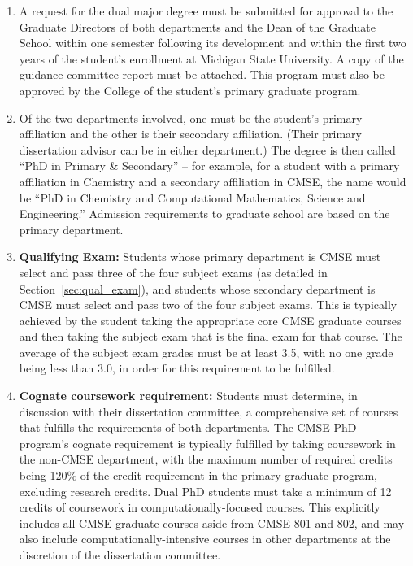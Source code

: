 \begin{enumerate}

\item  A request for the dual major degree must be submitted for
  approval to the Graduate Directors of both departments and the Dean
  of the Graduate School within one semester following its development
  and within the first two years of the student’s enrollment at
  Michigan State University.  A copy of the guidance committee report
  must be attached.  This program must also be approved by the College
  of the student's primary graduate program.

\item Of the two departments involved, one must be the student's
  primary affiliation and the other is their secondary affiliation.
  (Their primary dissertation advisor can be in either department.)  The
  degree is then called ``PhD in Primary \& Secondary'' -- for
  example, for a student with a primary affiliation in Chemistry and a
  secondary affiliation in CMSE, the name would be ``PhD in Chemistry
  and Computational Mathematics, Science and Engineering.'' Admission
  requirements to graduate school are based on the primary department.

\item \textbf{Qualifying Exam:} Students whose primary department is
  CMSE must select and pass three of the four subject exams (as
  detailed in Section~\ref{sec:qual_exam}), and students whose
  secondary department is CMSE must select and pass two of the four
  subject exams.  This is typically achieved by the student taking the
  appropriate core CMSE graduate courses and then taking the subject
  exam that is the final exam for that course.  The average of the
  subject exam grades must be at least 3.5, with no one grade being
  less than 3.0, in order for this requirement to be fulfilled. 

\item \textbf{Cognate coursework requirement:}  Students must
  determine, in discussion with their dissertation committee, a
  comprehensive set of courses that fulfills the requirements of both
  departments.  The CMSE PhD program's cognate requirement is
  typically fulfilled by taking coursework in the non-CMSE department,
  with the maximum number of required credits being 120\% of the
  credit requirement in the primary graduate program, excluding
  research credits.  Dual PhD students
  must take a minimum of 12 credits of coursework in
  computationally-focused courses.  This explicitly includes all CMSE
  graduate courses aside from CMSE 801 and 802, and may also include
  computationally-intensive courses in other departments at the
  discretion of the dissertation committee.


\end{enumerate}
